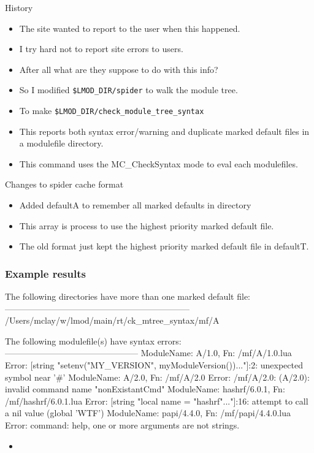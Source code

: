 \documentclass{beamer}
\begin{document}
\begin{frame}{History}
  \begin{itemize}
    \item The site wanted to report to the user when this happened.
    \item I try hard not to report site errors to users.
    \item After all what are they suppose to do with this info?
    \item So I modified \texttt{\$LMOD\_DIR/spider} to walk the module
      tree.
    \item To make \texttt{\$LMOD\_DIR/check\_module\_tree\_syntax}
    \item This reports both syntax error/warning and duplicate marked
      default files in a modulefile directory.
    \item This command uses the MC\_CheckSyntax mode to eval each modulefiles.
  \end{itemize}
\end{frame}

\begin{frame}{Changes to spider cache format}
  \begin{itemize}
    \item Added defaultA to remember all marked defaults in directory
    \item This array is process to use the highest priority marked
      default file.
    \item The old format just kept the highest priority marked default
      file in defaultT.
  \end{itemize}
\end{frame}

\begin{frame}[fragile]
    \frametitle{Example results}
 {\tiny
    \begin{semiverbatim}
The following directories have more than one marked default file:
-----------------------------------------------------------------
  /Users/mclay/w/lmod/main/rt/ck_mtree_syntax/mf/A


The following modulefile(s) have syntax errors:
-----------------------------------------------
  ModuleName: A/1.0, Fn: /mf/A/1.0.lua 
     Error: [string "setenv("MY_VERSION", myModuleVersion())..."]:2: unexpected symbol near '#' 
  ModuleName: A/2.0, Fn: /mf/A/2.0 
     Error: /mf/A/2.0: (A/2.0): invalid command name "nonExistantCmd"
  ModuleName: hashrf/6.0.1, Fn: /mf/hashrf/6.0.1.lua 
     Error: [string "local name = "hashrf"..."]:16: attempt to call a nil value (global 'WTF') 
  ModuleName: papi/4.4.0, Fn: /mf/papi/4.4.0.lua 
     Error: command: help, one or more arguments are not strings. 
    \end{semiverbatim}
}
  \begin{itemize}
    \item
  \end{itemize}

\end{frame}
\end{document}
